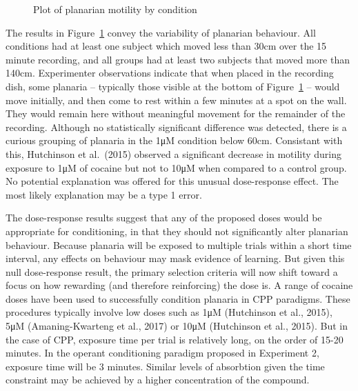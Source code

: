 \documentclass[
  letterpaper,
  DIV=11,
  numbers=noendperiod,
  oneside]{scrartcl}
\begin{document}
\begin{figure}


\caption{\label{fig-boxplot}Plot of planarian motility by condition}

\end{figure}%

The results in Figure~\ref{fig-boxplot} convey the variability of
planarian behaviour. All conditions had at least one subject which moved
less than 30cm over the 15 minute recording, and all groups had at least
two subjects that moved more than 140cm. Experimenter observations
indicate that when placed in the recording dish, some planaria --
typically those visible at the bottom of Figure~\ref{fig-boxplot} --
would move initially, and then come to rest within a few minutes at a
spot on the wall. They would remain here without meaningful movement for
the remainder of the recording. Although no statistically significant
difference was detected, there is a curious grouping of planaria in the
1μM condition below 60cm. Consistant with this, Hutchinson et al.~(2015)
observed a significant decrease in motility during exposure to 1μM of
cocaine but not to 10μM when compared to a control group. No potential
explanation was offered for this unusual dose-response effect. The most
likely explanation may be a type 1 error.

The dose-response results suggest that any of the proposed doses would
be appropriate for conditioning, in that they should not significantly
alter planarian behaviour. Because planaria will be exposed to multiple
trials within a short time interval, any effects on behaviour may mask
evidence of learning. But given this null dose-response result, the
primary selection criteria will now shift toward a focus on how
rewarding (and therefore reinforcing) the dose is. A range of cocaine
doses have been used to successfully condition planaria in CPP
paradigms. These procedures typically involve low doses such as 1μM
(Hutchinson et al., 2015), 5μM (Amaning-Kwarteng et al., 2017) or 10μM
(Hutchinson et al., 2015). But in the case of CPP, exposure time per
trial is relatively long, on the order of 15-20 minutes. In the operant
conditioning paradigm proposed in Experiment 2, exposure time will be 3
minutes. Similar levels of absorbtion given the time constraint may be
achieved by a higher concentration of the compound.
\end{document}
